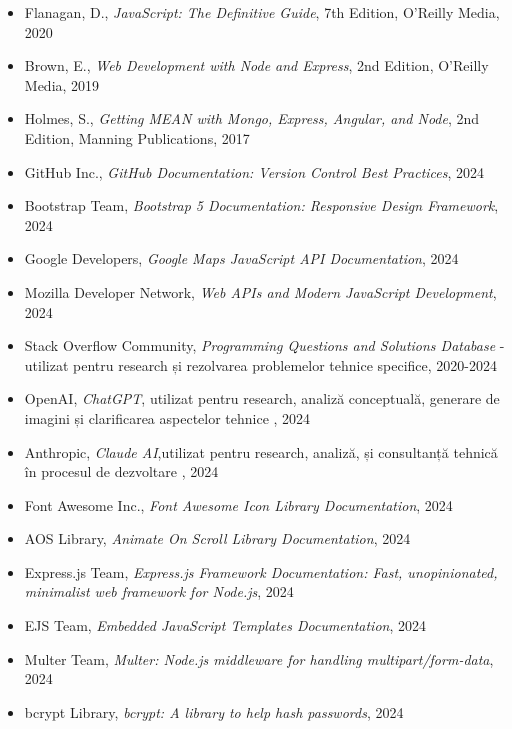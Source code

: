 \documentclass[12pt,a4paper]{report}
\begin{document}
\begin{itemize}
    \item Flanagan, D., \textit{JavaScript: The Definitive Guide}, 7th Edition, O'Reilly Media, 2020
    \item Brown, E., \textit{Web Development with Node and Express}, 2nd Edition, O'Reilly Media, 2019
    \item Holmes, S., \textit{Getting MEAN with Mongo, Express, Angular, and Node}, 2nd Edition, Manning Publications, 2017
    \item GitHub Inc., \textit{GitHub Documentation: Version Control Best Practices}, 2024
    \item Bootstrap Team, \textit{Bootstrap 5 Documentation: Responsive Design Framework}, 2024
    \item Google Developers, \textit{Google Maps JavaScript API Documentation}, 2024
    \item Mozilla Developer Network, \textit{Web APIs and Modern JavaScript Development}, 2024
    \item Stack Overflow Community, \textit{Programming Questions and Solutions Database} - utilizat pentru research și rezolvarea problemelor tehnice specifice, 2020-2024
    \item OpenAI, \textit{ChatGPT}, utilizat pentru research, analiză conceptuală, generare de imagini și clarificarea aspectelor tehnice , 2024
    \item Anthropic, \textit{Claude AI},utilizat pentru research, analiză, și consultanță tehnică în procesul de dezvoltare , 2024
    \item Font Awesome Inc., \textit{Font Awesome Icon Library Documentation}, 2024
    \item AOS Library, \textit{Animate On Scroll Library Documentation}, 2024
    \item Express.js Team, \textit{Express.js Framework Documentation: Fast, unopinionated, minimalist web framework for Node.js}, 2024
    \item EJS Team, \textit{Embedded JavaScript Templates Documentation}, 2024
    \item Multer Team, \textit{Multer: Node.js middleware for handling multipart/form-data}, 2024
    \item bcrypt Library, \textit{bcrypt: A library to help hash passwords}, 2024
\end{itemize}
\end{document}
